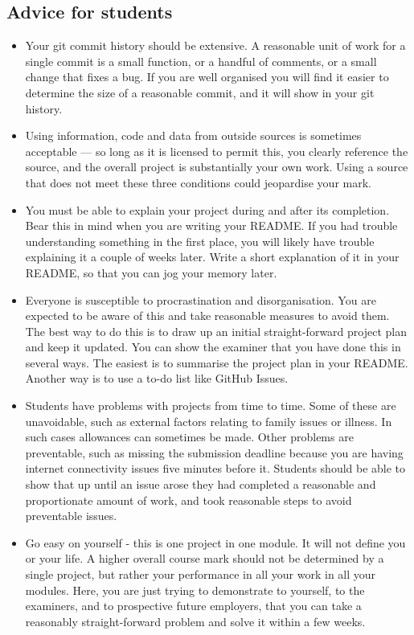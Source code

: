 \documentclass[12pt, a4paper, hidelinks]{scrartcl}
\begin{document}
\subsection*{Advice for students}
  \begin{itemize}
    \item
      Your git commit history should be extensive.
      A reasonable unit of work for a single commit is a small function, or a handful of comments, or a small change that fixes a bug.
      If you are well organised you will find it easier to determine the size of a reasonable commit, and it will show in your git history.
    \item
      Using information, code and data from outside sources is sometimes acceptable --- so long as it is licensed to permit this, you clearly reference the source, and the overall project is substantially your own work.
      Using a source that does not meet these three conditions could jeopardise your mark.
    \item
      You must be able to explain your project during and after its completion.
      Bear this in mind when you are writing your README.
      If you had trouble understanding something in the first place, you will likely have trouble explaining it a couple of weeks later.
      Write a short explanation of it in your README, so that you can jog your memory later.
    \item
      Everyone is susceptible to procrastination and disorganisation.
      You are expected to be aware of this and take reasonable measures to avoid them.
      The best way to do this is to draw up an initial straight-forward project plan and keep it updated.
      You can show the examiner that you have done this in several ways.
      The easiest is to summarise the project plan in your README.
      Another way is to use a to-do list like GitHub Issues.
    \item
      Students have problems with projects from time to time.
      Some of these are unavoidable, such as external factors relating to family issues or illness.
      In such cases allowances can sometimes be made.
      Other problems are preventable, such as missing the submission deadline because you are having internet connectivity issues five minutes before it.
      Students should be able to show that up until an issue arose they had completed a reasonable and proportionate amount of work, and took reasonable steps to avoid preventable issues.
    \item
      Go easy on yourself - this is one project in one module.
      It will not define you or your life.
      A higher overall course mark should not be determined by a single project, but rather your performance in all your work in all your modules.
      Here, you are just trying to demonstrate to yourself, to the examiners, and to prospective future employers, that you can take a reasonably straight-forward problem and solve it within a few weeks.
  \end{itemize}


  
  
\end{document}
